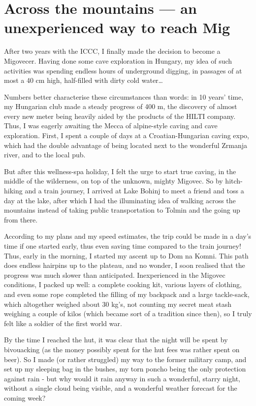 
\hypertarget{across-the-mountains-an-unexperienced-way-to-reach-mig}{%
\section{Across the mountains --- an unexperienced way to reach
Mig}\label{across-the-mountains-an-unexperienced-way-to-reach-mig}}

After two years with the ICCC, I finally made the decision to become a
Migovecer. Having done some cave exploration in Hungary, my idea of such
activities was spending endless hours of underground digging, in
passages of at most a 40 cm high, half-filled with dirty cold
water\ldots{}

Numbers better characterise these circumstances than words: in 10 years'
time, my Hungarian club made a steady progress of 400 m, the discovery
of almost every new meter being heavily aided by the products of the
HILTI company. Thus, I was eagerly awaiting the Mecca of alpine-style
caving and cave exploration. First, I spent a couple of days at a
Croatian-Hungarian caving expo, which had the double advantage of being
located next to the wonderful Zrmanja river, and to the local pub.

But after this wellness-spa holiday, I felt the urge to start true
caving, in the middle of the wilderness, on top of the unknown, mighty
Migovec. So by hitch-hiking and a train journey, I arrived at Lake
Bohinj to meet a friend and toss a day at the lake, after which I had
the illuminating idea of walking across the mountains instead of taking
public transportation to Tolmin and the going up from there.

According to my plans and my speed estimates, the trip could be made in
a day's time if one started early, thus even saving time compared to the
train journey! Thus, early in the morning, I started my ascent up to Dom
na Komni. This path does endless hairpins up to the plateau, and no
wonder, I soon realised that the progress was much slower than
anticipated. Inexperienced in the Migovec conditions, I packed up well:
a complete cooking kit, various layers of clothing, and even some rope
completed the filling of my backpack and a large tackle-sack, which
altogether weighed about 30 kg's, not counting my secret meat stash
weighing a couple of kilos (which became sort of a tradition since
then), so I truly felt like a soldier of the first world war.

By the time I reached the hut, it was clear that the night will be spent
by bivouacking (as the money possibly spent for the hut fees was rather
spent on beer). So I made (or rather struggled) my way to the former
military camp, and set up my sleeping bag in the bushes, my torn poncho
being the only protection against rain - but why would it rain anyway in
such a wonderful, starry night, without a single cloud being visible,
and a wonderful weather forecast for the coming week?

